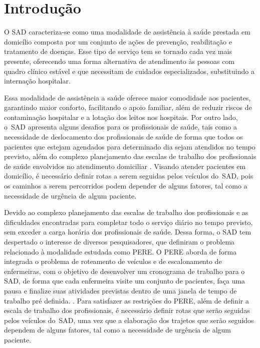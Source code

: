 \section{\esp Introdução \label{introducao}}

O \ac{SAD} caracteriza-se como uma modalidade de assistência à saúde prestada em domicílio composta por um conjunto de ações de prevenção, reabilitação e tratamento de doenças.
Esse tipo de serviço tem se tornado cada vez mais presente, oferecendo uma forma alternativa de atendimento às pessoas com quadro clínico estável e que necessitam de cuidados especializados, substituindo a internação hospitalar.

Essa modalidade de assistência a saúde oferece maior comodidade aos pacientes, garantindo maior conforto, facilitando o apoio familiar, além de reduzir riscos de contaminação hospitalar e a lotação dos leitos nos hospitais.
Por outro lado, o~\ac{SAD} apresenta alguns desafios para os profissionais de saúde, tais como a necessidade de deslocamento dos profissionais de saúde de forma  que todos os pacientes que estejam agendados para determinado dia sejam atendidos no tempo previsto, além do complexo planejamento das escalas de trabalho dos profissionais de saúde envolvidos no atendimento domiciliar . 
Visando atender pacientes em domicílio, é necessário definir rotas a serem seguidas pelos veículos do~\ac{SAD}, pois os caminhos a serem percorridos podem depender de alguns fatores, tal como a necessidade de urgência de algum paciente. 

Devido ao complexo planejamento das escalas de trabalho dos profissionais e as dificuldades encontradas para completar todo o serviço diário no tempo previsto, sem exceder a carga horária dos profissionais de saúde. Dessa forma, o \ac{SAD} tem despertado o interesse de diversos pesquisadores, que definiram o problema relacionado à modalidade estudada como \ac{PERE}.
O \ac{PERE} aborda de forma integrada o problema de roteamento de veículos e de escalonamento de enfermeiras, com o objetivo de desenvolver um cronograma de trabalho para o \ac{SAD}, de forma que cada enfermeira visite um conjunto de pacientes, faça uma pausa e finalize suas atividades previstas dentro de uma janela de tempo de trabalho pré definida. \cite{trabelsi:2012}. 
Para satisfazer as restrições do \ac{PERE}, além de definir a escala de trabalho dos profissionais, é necessário definir rotas que serão seguidas pelos veículos do~\ac{SAD}, uma vez que a elaboração dos trajetos que serão seguidos dependem de alguns fatores, tal como a necessidade de urgência de algum paciente. 

